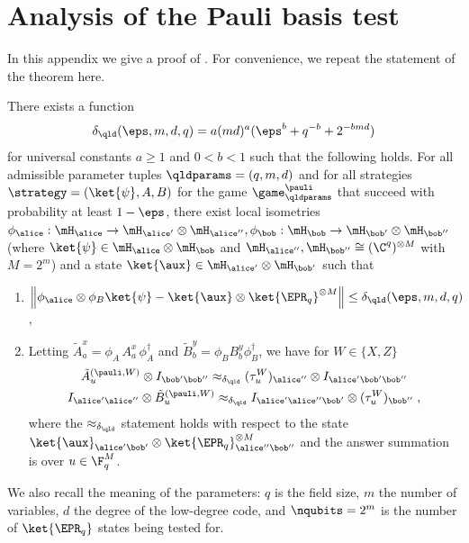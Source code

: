 \section{Analysis of the Pauli basis test}
\label{sec:qld-analysis}
In this appendix we give a proof of . For
convenience, we repeat the statement of the theorem here.

\begin{theorem}
  \label{thm:pauli-appendix}
There exists a function 
\[\delta_{\qld}(\eps,m,d,q) = a(md)^a(\eps^b + q^{-b} + 2^{-bmd})\]
 for universal constants $a \geq 1$ and $0 < b < 1$ such that the following holds. For all admissible parameter tuples $\qldparams = (q,m,d)$ and for all strategies $\strategy = (\ket{\psi},A,B)$ for the game $\game^\pauli_\qldparams$ that succeed with probability at least $1 - \eps$, there exist local isometries $\phi_\alice: \mH_\alice \to \mH_{\alice'} \otimes \mH_{\alice''},\phi_\bob: \mH_\bob \to \mH_{\bob'} \otimes \mH_{\bob''}$ (where $\ket{\psi} \in \mH_\alice \otimes \mH_\bob$ and $\mH_{\alice''},\mH_{\bob''} \cong (\C^q)^{\otimes M}$ with $M = 2^m$) and a state $\ket{\aux} \in \mH_{\alice'} \otimes \mH_{\bob'}$ such that 
\begin{enumerate}
    \item $\left \| \phi_\alice \otimes \phi_B \ket{\psi} - \ket{\aux} \otimes \ket{\EPR_q}^{\otimes M}  \right \| \leq \delta_{\qld}(\eps,m,d,q)$,
    \item Letting $\tilde{A}^x_a = \phi_A\, A^x_a \, \phi_A^\dagger$ and $\tilde{B}^y_b = \phi_B B^y_b \phi_B^\dagger$, we have for $W \in \{X,Z\}$
    \begin{gather*}
        \tilde{A}^{(\pauli,W)}_u \otimes I_{\bob'\bob''} \approx_{\delta_{\qld}} (\tau^W_u)_{\alice''} \otimes I_{\alice' \bob' \bob''} \\
        I_{\alice'\alice''} \otimes \tilde{B}^{(\pauli,W)}_u    \approx_{\delta_{\qld}} I_{\alice' \alice'' \bob'} \otimes (\tau^W_u)_{\bob''}\;,
    \end{gather*}
    where the $\approx_{\delta_{\qld}}$ statement holds with respect to the state $\ket{\aux}_{\alice'\bob'} \otimes \ket{\EPR_q}^{\otimes M}_{\alice''\bob''}$ and the answer summation is over $u \in \F_q^M$.
\end{enumerate}
\end{theorem}
We also recall the meaning of the parameters: $q$ is the field size,
$m$ the number of variables, $d$ the degree of the low-degree code,
and $\nqubits=2^m$ is the number of $\ket{\EPR_q}$ states being tested for.

